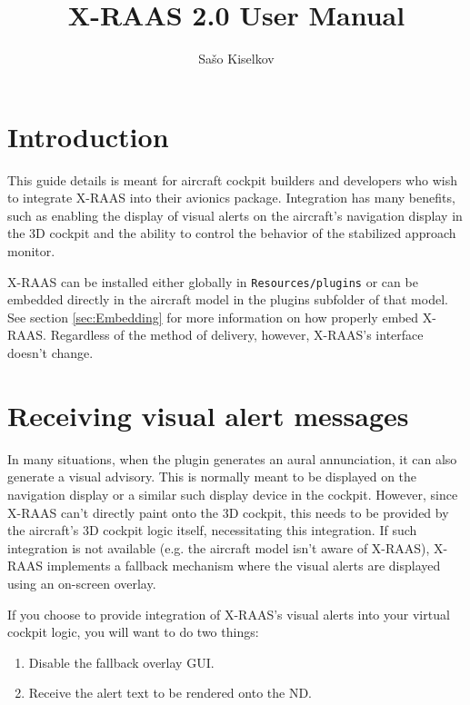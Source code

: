 \documentclass[a4paper,12pt]{article}
\title{X-RAAS 2.0 User Manual}
\author{Sašo Kiselkov}
\begin{document}


\tableofcontents

\newpage

\section{Introduction}

This guide details is meant for aircraft cockpit builders and developers
who wish to integrate X-RAAS into their avionics package. Integration has
many benefits, such as enabling the display of visual alerts on the
aircraft's navigation display in the 3D cockpit and the ability to
control the behavior of the stabilized approach monitor.

X-RAAS can be installed either globally in \texttt{Resources/plugins} or
can be embedded directly in the aircraft model in the plugins subfolder
of that model. See section \ref{sec:Embedding} for more information on
how properly embed X-RAAS. Regardless of the method of delivery, however,
X-RAAS's interface doesn't change.

\section{Receiving visual alert messages}

In many situations, when the plugin generates an aural annunciation, it
can also generate a visual advisory. This is normally meant to be
displayed on the navigation display or a similar such display device in
the cockpit. However, since X-RAAS can't directly paint onto the 3D
cockpit, this needs to be provided by the aircraft's 3D cockpit logic
itself, necessitating this integration. If such integration is not
available (e.g. the aircraft model isn't aware of X-RAAS), X-RAAS
implements a fallback mechanism where the visual alerts are displayed
using an on-screen overlay.

If you choose to provide integration of X-RAAS's visual alerts into your
virtual cockpit logic, you will want to do two things:

\begin{enumerate}

\item Disable the fallback overlay GUI.

\item Receive the alert text to be rendered onto the ND.

\end{enumerate}
\end{document}
